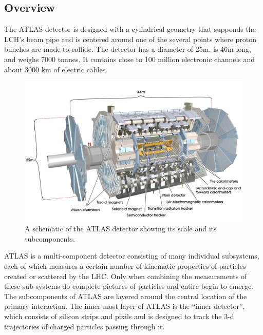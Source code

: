 \subsection{Overview}

The ATLAS detector is designed with a cylindrical geometry that supponds the LCH's beam pipe and is centered around one of the several points where proton bunches are made to collide.
The detector has a diameter of 25m, is 46m long, and weighs 7000 tonnes.
It contains close to 100 million electronic channels and about 3000 km of electric cables.

\begin{figure}
  \begin{center}
    \includegraphics[width=125mm]{figures/atlas/AtlasDetecterOverview.jpg}
  \end{center}
  \caption{A schematic of the ATLAS detector showing its scale and its subcomponents.}
  \label{img:AtlasDetectorOverview}
\end{figure}

ATLAS is a multi-component detector consisting of many individual subsystems, each of which measures a certain number of kinematic properties of particles created or scattered by the LHC.
Only when combining the measurements of these sub-systems do complete pictures of particles and entire begin to emerge.
The subcomponents of ATLAS are layered around the central location of the primary interaction.
The inner-most layer of ATLAS is the ``inner detector'', which consists of silicon strips and pixils and is designed to track the 3-d trajectories of charged particles passing through it.

